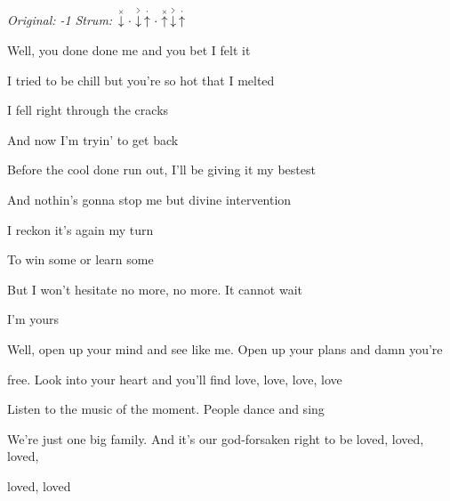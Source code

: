\begin{song}


\begin{headerbox}
\RaiseBoxWithAccents
{} \quad
\textit{Original: -1} \quad
\textit{Strum:} $\ChuckDown\Miss\AccentDown\StaccatoUp\Miss\ChuckUp\AccentDown\StaccatoUp$
\end{headerbox}


\begin{hchordbox}
\end{hchordbox}

\large

\bigskip

Well, you done done me and you bet I felt it \par
I tried to be chill but you're so hot that I melted \par
I fell right through the cracks \par
And now I'm tryin' to get back \par
Before the cool done run out, I'll be giving it my bestest \par
And nothin's gonna stop me but divine intervention \par
I reckon it's again my turn \par
To win some or learn some \par

\bigskip

But I won't hesitate no more, no more. It cannot wait \par
I'm yours    \par

\bigskip

 Well, open up your mind and see like me. Open up your plans and damn you're \par
{}free. Look into your heart and you'll find love, love, love, love \par
{}Listen to the music of the moment. People dance and sing \par
We're just one big family. And it's our god-forsaken right to be loved, loved, loved, \par
loved, loved \par

\bigskip


\end{song}
